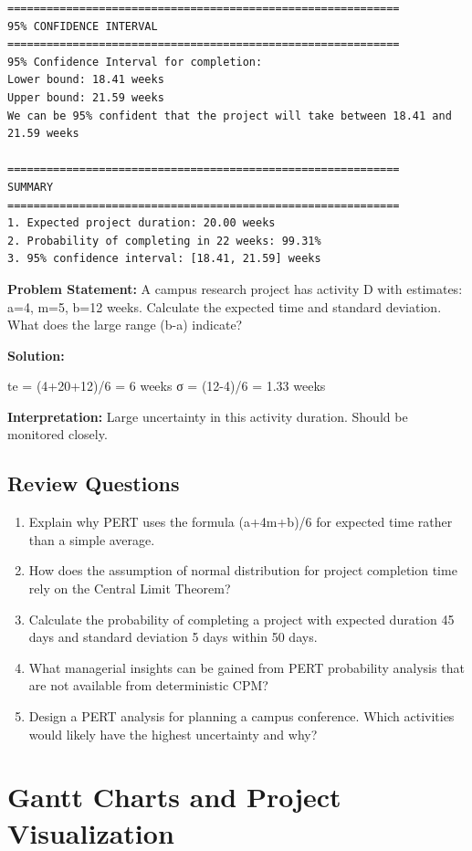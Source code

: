 \documentclass[
  letterpaper,
  DIV=11,
  numbers=noendperiod]{scrreprt}
\begin{document}
\begin{verbatim}
============================================================
95% CONFIDENCE INTERVAL
============================================================
95% Confidence Interval for completion:
Lower bound: 18.41 weeks
Upper bound: 21.59 weeks
We can be 95% confident that the project will take between 18.41 and 21.59 weeks

============================================================
SUMMARY
============================================================
1. Expected project duration: 20.00 weeks
2. Probability of completing in 22 weeks: 99.31%
3. 95% confidence interval: [18.41, 21.59] weeks
\end{verbatim}

\textbf{Problem Statement:} A campus research project has activity D
with estimates: a=4, m=5, b=12 weeks. Calculate the expected time and
standard deviation. What does the large range (b-a) indicate?

\textbf{Solution:}

te = (4+20+12)/6 = 6 weeks σ = (12-4)/6 = 1.33 weeks

\textbf{Interpretation:} Large uncertainty in this activity duration.
Should be monitored closely.

\subsection{Review Questions}\label{review-questions-8}

\begin{enumerate}
\def\labelenumi{\arabic{enumi}.}
\item
  Explain why PERT uses the formula (a+4m+b)/6 for expected time rather
  than a simple average.
\item
  How does the assumption of normal distribution for project completion
  time rely on the Central Limit Theorem?
\item
  Calculate the probability of completing a project with expected
  duration 45 days and standard deviation 5 days within 50 days.
\item
  What managerial insights can be gained from PERT probability analysis
  that are not available from deterministic CPM?
\item
  Design a PERT analysis for planning a campus conference. Which
  activities would likely have the highest uncertainty and why?
\end{enumerate}

\section{Gantt Charts and Project
Visualization}\label{gantt-charts-and-project-visualization}
\end{document}
